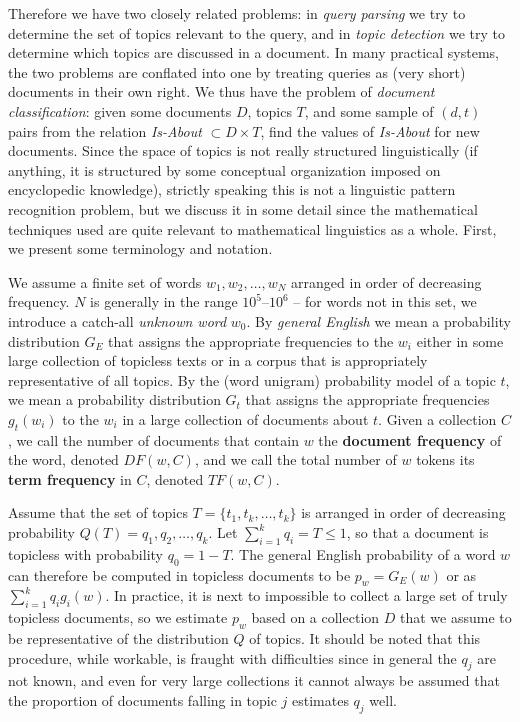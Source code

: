 Therefore we have two closely related problems: in {\it query parsing} we try
to determine the set of topics relevant to the query, and in {\it topic
  detection} we try to determine which topics are discussed in a document. In
many practical systems, the two problems are conflated into one by treating
queries as (very short) documents in their own right. We thus have the problem
of {\it document classification}: given some documents $D$, topics $T$, and
some sample of $(d,t)$ pairs from the relation {\it Is-About} $\subset D
\times T$, find the values of {\it Is-About} for new documents. Since the
space of topics is not really structured linguistically (if anything, it is
structured by some conceptual organization imposed on encyclopedic knowledge),
strictly speaking this is not a linguistic pattern recognition problem, but we
discuss it in some detail since the mathematical techniques used are quite
relevant to mathematical linguistics as a whole. First, we present some
terminology and notation.  
 

We assume a finite set of words $w_1,w_2,\ldots,w_N$ arranged in order of
decreasing frequency. $N$ is generally in the range $10^5$--$10^6$ -- for
words not in this set, we introduce a catch-all {\it unknown word} $w_0$. By
{\it general English} we mean a probability distribution $G_E$ that assigns
the appropriate frequencies to the $w_i$ either in some large collection of
topicless texts or in a corpus that is appropriately representative of all
topics. By the (word unigram) probability model of a topic $t$, we mean a
probability distribution $G_t$ that assigns the appropriate frequencies
$g_t(w_i)$ to the $w_i$ in a large collection of documents about $t$. Given a
collection $C$, we call the number of documents that contain $w$ the {\bf
  document frequency} of the word, denoted $DF(w,C)$, and we call the total
number of $w$ tokens its {\bf term frequency} in $C$, denoted $TF(w,C)$.
  
 

Assume that the set of topics $T=\{t_1,t_k,\ldots,t_k\}$ is arranged in order
of decreasing probability $Q(T)=q_1,q_2,\ldots,q_k$. Let $\sum_{i=1}^k q_i = T
\leq 1$, so that a document is topicless with probability $q_0=1-T$. The 
general English probability of a word $w$ can therefore be computed in
topicless documents to be $p_w=G_E(w)$ or as $\sum_{i=1}^k q_i g_i(w)$. In
practice, it is next to impossible to collect a large set of truly topicless
documents, so we estimate $p_w$ based on a collection $D$ that we assume to be
representative of the distribution $Q$ of topics. It should be noted that this
procedure, while workable, is fraught with difficulties since in general the
$q_j$ are not known, and even for very large collections it cannot always be
assumed that the proportion of documents falling in topic $j$ estimates $q_j$
well.

